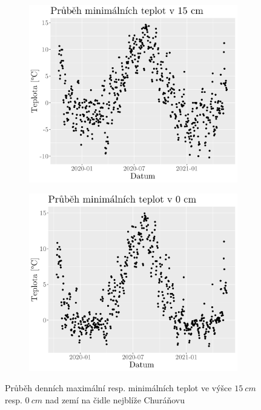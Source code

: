 \begin{figure}
	\hfill
	\begin{subfigure}{0.45\textwidth}
  \includegraphics[width=\textwidth]{img/maxtempmin15cm.png}
		\caption{}
		\label{fig:maxtempmin15cm}
	\end{subfigure}
	\hfill
	\begin{subfigure}{0.45\textwidth}
  \includegraphics[width=\textwidth]{img/maxtempmin0cm.png}
		\caption{}
		\label{fig:maxtempmin0cm}
	\end{subfigure}
	\caption{Průběh denních maximální resp. minimálních teplot ve výšce $\SI{15}{cm}$ resp. $\SI{0}{cm}$ nad zemí na čidle nejblíže Churáňovu}
	\label{fig:hours}
\end{figure}

